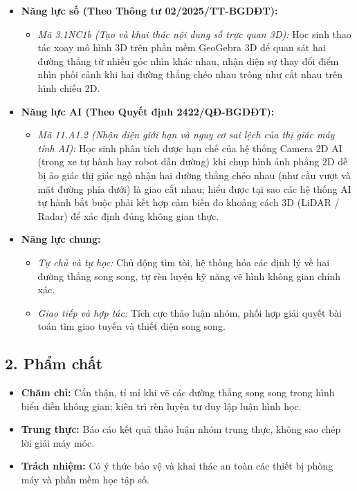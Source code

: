 \documentclass[12pt, a4paper]{article}
\begin{document}
\begin{itemize}[leftmargin=1.2cm]
    \item \textbf{Năng lực số (Theo Thông tư 02/2025/TT-BGDĐT):}
    \begin{itemize}[leftmargin=0.6cm]
        \item \textit{Mã 3.1NC1b (Tạo và khai thác nội dung số trực quan 3D):} Học sinh thao tác xoay mô hình 3D trên phần mềm GeoGebra 3D để quan sát hai đường thẳng từ nhiều góc nhìn khác nhau, nhận diện sự thay đổi điểm nhìn phối cảnh khi hai đường thẳng chéo nhau trông như cắt nhau trên hình chiếu 2D.
    \end{itemize}

    \item \textbf{Năng lực AI (Theo Quyết định 2422/QĐ-BGDĐT):}
    \begin{itemize}[leftmargin=0.6cm]
        \item \textit{Mã 11.A1.2 (Nhận diện giới hạn và nguy cơ sai lệch của thị giác máy tính AI):} Học sinh phân tích được hạn chế của hệ thống Camera 2D AI (trong xe tự hành hay robot dẫn đường) khi chụp hình ảnh phẳng $2\text{D}$ dễ bị ảo giác thị giác ngộ nhận hai đường thẳng chéo nhau (như cầu vượt và mặt đường phía dưới) là giao cắt nhau; hiểu được tại sao các hệ thống AI tự hành bắt buộc phải kết hợp cảm biến đo khoảng cách 3D (LiDAR / Radar) để xác định đúng không gian thực.
    \end{itemize}

    \item \textbf{Năng lực chung:}
    \begin{itemize}[leftmargin=0.6cm]
        \item \textit{Tự chủ và tự học:} Chủ động tìm tòi, hệ thống hóa các định lý về hai đường thẳng song song, tự rèn luyện kỹ năng vẽ hình không gian chính xác.
        \item \textit{Giao tiếp và hợp tác:} Tích cực thảo luận nhóm, phối hợp giải quyết bài toán tìm giao tuyến và thiết diện song song.
    \end{itemize}
\end{itemize}

\subsection*{2. Phẩm chất}

\begin{itemize}[leftmargin=1.2cm]
    \item \textbf{Chăm chỉ:} Cẩn thận, tỉ mỉ khi vẽ các đường thẳng song song trong hình biểu diễn không gian; kiên trì rèn luyện tư duy lập luận hình học.
    \item \textbf{Trung thực:} Báo cáo kết quả thảo luận nhóm trung thực, không sao chép lời giải máy móc.
    \item \textbf{Trách nhiệm:} Có ý thức bảo vệ và khai thác an toàn các thiết bị phòng máy và phần mềm học tập số.
\end{itemize}
\end{document}
